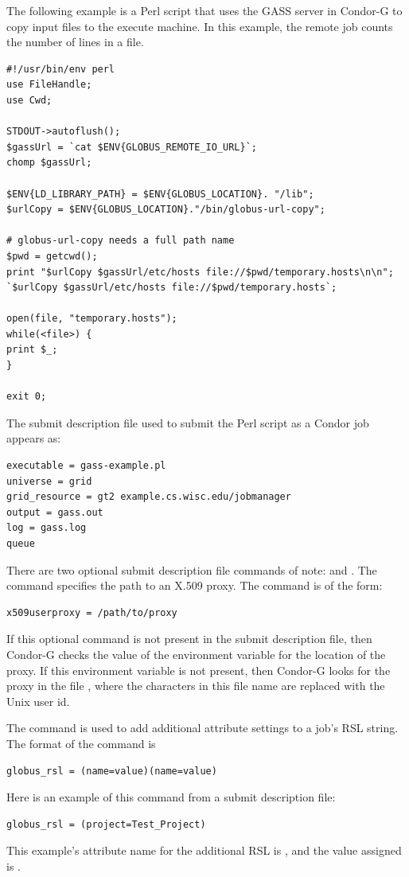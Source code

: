The following example is a Perl script that uses the GASS server in Condor-G
to copy input files to the execute machine.
In this example, the remote job
counts the number of lines in a file.

\footnotesize
\begin{verbatim}
#!/usr/bin/env perl
use FileHandle;
use Cwd;

STDOUT->autoflush();
$gassUrl = `cat $ENV{GLOBUS_REMOTE_IO_URL}`;
chomp $gassUrl;

$ENV{LD_LIBRARY_PATH} = $ENV{GLOBUS_LOCATION}. "/lib";
$urlCopy = $ENV{GLOBUS_LOCATION}."/bin/globus-url-copy";

# globus-url-copy needs a full path name
$pwd = getcwd();
print "$urlCopy $gassUrl/etc/hosts file://$pwd/temporary.hosts\n\n";
`$urlCopy $gassUrl/etc/hosts file://$pwd/temporary.hosts`;

open(file, "temporary.hosts");
while(<file>) {
print $_;
}

exit 0;
\end{verbatim}
\normalsize

The submit description file used to submit the Perl script as
a Condor job appears as:

\footnotesize
\begin{verbatim}
executable = gass-example.pl
universe = grid
grid_resource = gt2 example.cs.wisc.edu/jobmanager
output = gass.out
log = gass.log
queue
\end{verbatim}
\normalsize

There are two optional submit description file commands
of note:
 and
.
The  command specifies the path to
an X.509 proxy.
The command is of the form:
\begin{verbatim}
x509userproxy = /path/to/proxy
\end{verbatim}
If this optional command is not present in the submit description file,
then Condor-G checks the value of the environment variable
 for the location of the proxy.
If this environment variable is not present, then Condor-G
looks for the proxy in the file
,
where the characters \verb@XXXX@ in this file name are
replaced with the Unix user id.

The  command is used to add additional
attribute settings to a job's RSL string.
The format of the  command is
\begin{verbatim}
globus_rsl = (name=value)(name=value)
\end{verbatim}
Here is an example of this command from a submit description file:
\begin{verbatim}
globus_rsl = (project=Test_Project)
\end{verbatim}
This example's attribute name for the additional RSL is
, and the value assigned is .



